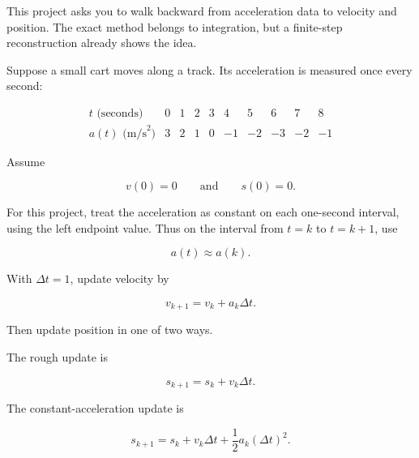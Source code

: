 This project asks you to walk backward from acceleration data to velocity and position.
The exact method belongs to integration, but a finite-step reconstruction already shows
the idea.

Suppose a small cart moves along a track.  Its acceleration is measured once every
second:

\[
\begin{array}{c|ccccccccc}
t\text{ (seconds)} & 0 & 1 & 2 & 3 & 4 & 5 & 6 & 7 & 8 \\ \hline
a(t)\text{ (m/s}^2\text{)} & 3 & 2 & 1 & 0 & -1 & -2 & -3 & -2 & -1
\end{array}
\]

Assume

\[
v(0)=0
\qquad\text{and}\qquad
s(0)=0.
\]

For this project, treat the acceleration as constant on each one-second interval, using
the left endpoint value.  Thus on the interval from \(t=k\) to \(t=k+1\), use

\[
a(t)\approx a(k).
\]

With \(\Delta t=1\), update velocity by

\[
v_{k+1}=v_k+a_k\Delta t.
\]

Then update position in one of two ways.

The rough update is

\[
s_{k+1}=s_k+v_k\Delta t.
\]

The constant-acceleration update is

\[
s_{k+1}=s_k+v_k\Delta t+\frac12a_k(\Delta t)^2.
\]

